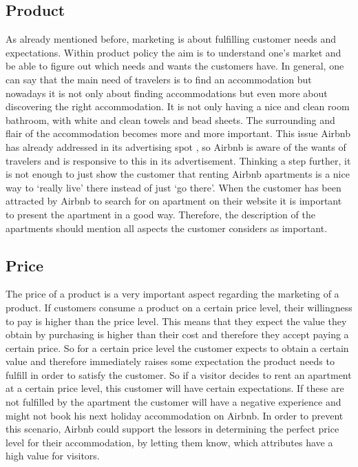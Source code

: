 \documentclass[journal]{IEEEtran}
\begin{document}
\subsection{Product}
\noindent As already mentioned before, marketing is about fulfilling customer needs and expectations. Within product policy the aim is to understand one’s market and be able to figure out which needs and wants the customers have. In general, one can say that the main need of travelers is to find an accommodation but nowadays it is not only about finding accommodations but even more about discovering the right accommodation. It is not only having a nice and clean room bathroom, with white and clean towels and bead sheets. The surrounding and flair of the accommodation becomes more and more important. This issue Airbnb has already addressed in its advertising spot \cite{RN6}, so Airbnb is aware of the wants of travelers and is responsive to this in its advertisement. Thinking a step further, it is not enough to just show the customer that renting Airbnb apartments is a nice way to ‘really live’ there instead of just ‘go there’. When the customer has been attracted by Airbnb to search for on apartment on their website it is important to present the apartment in a good way. Therefore, the description of the apartments should mention all aspects the customer considers as important.
\subsection{Price}
\noindent The price of a product is a very important aspect regarding the marketing of a product. If customers consume a product on a certain price level, their willingness to pay is higher than the price level. This means that they expect the value they obtain by purchasing is higher than their cost and therefore they accept paying a certain price. So for a certain price level the customer expects to obtain a certain value and therefore immediately raises some expectation the product needs to fulfill in order to satisfy the customer. So if a visitor decides to rent an apartment at a certain price level, this customer will have certain expectations. If these are not fulfilled by the apartment the customer will have a negative experience and might not book his next holiday accommodation on Airbnb. In order to prevent this scenario, Airbnb could support the lessors in determining the perfect price level for their accommodation, by letting them know, which attributes have a high value for visitors.
\end{document}
